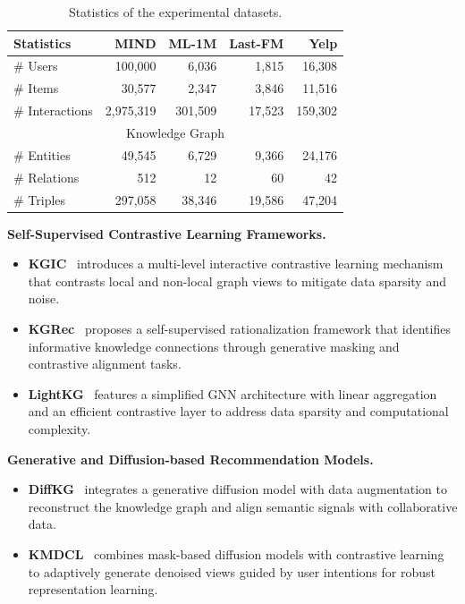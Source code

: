\setlength{\tabcolsep}{3pt}
\begin{table}[t]
	\small
	\centering
	\caption{Statistics of the experimental datasets.}
	\label{tab:data statistics}
		\begin{tabular}{lrrrr}
			\toprule
			Statistics & MIND & ML-1M & Last-FM & Yelp \\
			\midrule
			\# Users & 100,000 & 6,036 & 1,815 & 16,308 \\
			\# Items & 30,577 & 2,347 & 3,846 & 11,516 \\
			\# Interactions & 2,975,319 & 301,509 & 17,523 & 159,302 \\
			\midrule
			\multicolumn{5}{c}{Knowledge Graph} \\
			\midrule
			\# Entities & 49,545 & 6,729 & 9,366 & 24,176 \\
			\# Relations & 512 & 12 & 60 & 42 \\
			\# Triples & 297,058 & 38,346 & 19,586 & 47,204 \\
			\bottomrule
		\end{tabular}
\end{table}

\noindent\textbf{Self-Supervised Contrastive Learning Frameworks.}
\begin{itemize}
	\item \textbf{KGIC}~\cite{zou2022improving} introduces a multi-level interactive contrastive learning mechanism that contrasts local and non-local graph views to mitigate data sparsity and noise.
	\item \textbf{KGRec}~\cite{yang2023knowledge} proposes a self-supervised rationalization framework that identifies informative knowledge connections through generative masking and contrastive alignment tasks.
	\item \textbf{LightKG}~\cite{li2025lightkg} features a simplified GNN architecture with linear aggregation and an efficient contrastive layer to address data sparsity and computational complexity.
\end{itemize}

\noindent\textbf{Generative and Diffusion-based Recommendation Models.}
\begin{itemize}
	\item \textbf{DiffKG}~\cite{jiang2024diffkg} integrates a generative diffusion model with data augmentation to reconstruct the knowledge graph and align semantic signals with collaborative data.
	\item \textbf{KMDCL}~\cite{li2025mask} combines mask-based diffusion models with contrastive learning to adaptively generate denoised views guided by user intentions for robust representation learning.
\end{itemize}


